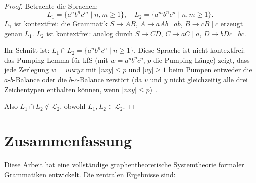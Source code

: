 ﻿\documentclass[a4paper,12pt]{article}
\theoremstyle{definition}
\begin{document}
\begin{proof}
Betrachte die Sprachen:
\[
L_1 = \{a^n b^n c^m \mid n, m \geq 1\}, \quad
L_2 = \{a^m b^n c^n \mid n, m \geq 1\}.
\]
$L_1$ ist kontextfrei: die Grammatik $S \to AB$, $A \to aAb \mid ab$,
$B \to cB \mid c$ erzeugt genau $L_1$.
$L_2$ ist kontextfrei: analog durch $S \to CD$, $C \to aC \mid a$,
$D \to bDc \mid bc$.

Ihr Schnitt ist:
$L_1 \cap L_2 = \{a^n b^n c^n \mid n \geq 1\}$.
Diese Sprache ist nicht kontextfrei: das Pumping-Lemma f\"ur kfS
(mit $w = a^p b^p c^p$, $p$ die Pumping-L\"ange) zeigt,
dass jede Zerlegung $w = uvxyz$ mit $|vxy| \leq p$ und $|vy| \geq 1$
beim Pumpen entweder die $a$-$b$-Balance oder die $b$-$c$-Balance zerst\"ort
(da $v$ und $y$ nicht gleichzeitig alle drei Zeichentypen enthalten k\"onnen,
wenn $|vxy| \leq p$)~\cite{sipser2013}.

Also $L_1 \cap L_2 \notin \mathcal{L}_2$, obwohl $L_1, L_2 \in \mathcal{L}_2$.
\end{proof}

\section{Zusammenfassung}

Diese Arbeit hat eine vollst\"andige graphentheoretische Systemtheorie formaler
Grammatiken entwickelt. Die zentralen Ergebnisse sind:
\end{document}
